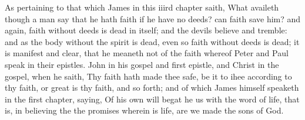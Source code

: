 As pertaining to that which James in this iiird chapter 
saith, What availeth though a man say that he hath faith 
if he have no deeds? can faith save him? and again, faith 
without deeds is dead in itself; and the devils believe and 
tremble: and as the body without the spirit is dead, even 
so faith without deeds is dead; it is manifest and clear, 
that he meaneth not of the faith whereof Peter and Paul 
speak in their epistles. John in his gospel and first epistle, 
and Christ in the gospel, when he saith, Thy faith hath 
made thee safe, be it to ihee according to thy faith, or 
great is thy faith, and so forth; and of which James himself
speaketh in the first chapter, saying, Of his own will 
begat he us with the word of life, that is, in believing the 
the promises wherein is life, are we made the sons of 
God. 

